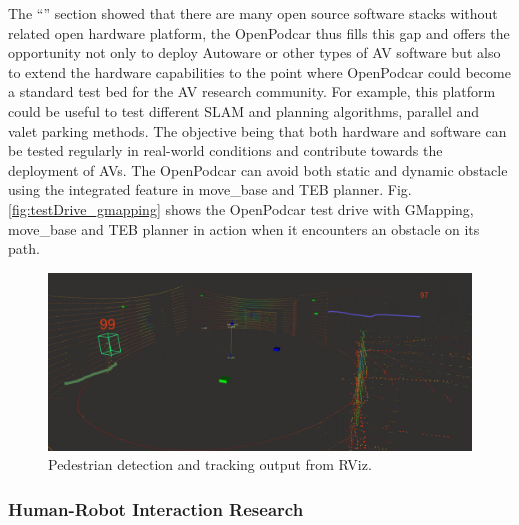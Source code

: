 \documentclass[a4paper]{article}
\begin{document}
	The ``'' section showed that there are many open source software stacks without related open hardware platform, the OpenPodcar thus fills this gap and offers the opportunity not only to deploy Autoware or other types of AV software but also to extend the hardware capabilities to the point where OpenPodcar could become a standard test bed for the AV research community. For example, this platform could be useful to test different SLAM and planning algorithms, parallel and valet parking methods. The objective being that both hardware and software can be tested regularly in real-world conditions and contribute towards the deployment of AVs. The OpenPodcar can avoid both static and dynamic obstacle using the integrated feature in move\_base and TEB planner. Fig. \ref{fig:testDrive_gmapping} shows the OpenPodcar test drive with GMapping, move\_base and TEB planner in action when it encounters an obstacle on its path.     
	
	\begin{figure}
		\centering
		\includegraphics[width=0.7\columnwidth]{software/tracker.png}
		\caption{Pedestrian detection and tracking output from RViz.}
		\label{fig:detection_tracking}
	\end{figure}
	
	\subsubsection{Human-Robot Interaction Research}
	
\end{document}

